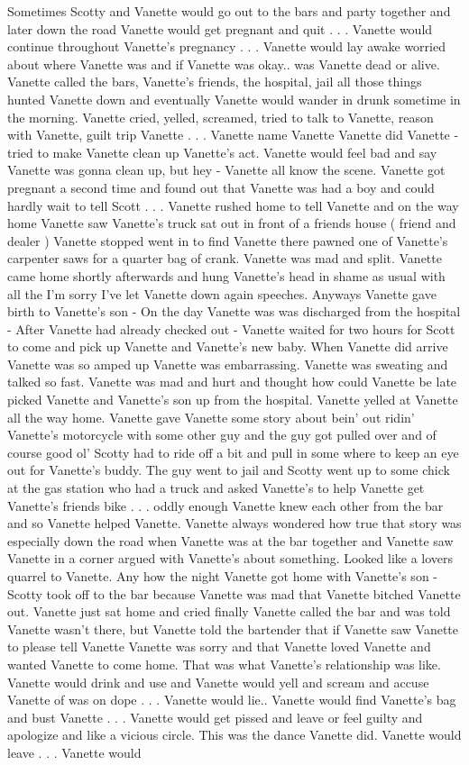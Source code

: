 \documentclass[12pt]{book}
\begin{document}
Sometimes Scotty and Vanette would go out to the bars and party together and later down the road Vanette would get pregnant and quit  . . .  Vanette would continue throughout Vanette's pregnancy  . . .  Vanette would lay awake worried about where Vanette was and if Vanette was okay.. was Vanette dead or alive. Vanette called the bars, Vanette's friends, the hospital, jail all those things hunted Vanette down and eventually Vanette would wander in drunk sometime in the morning. Vanette cried, yelled, screamed, tried to talk to Vanette, reason with Vanette, guilt trip Vanette  . . .  Vanette name Vanette Vanette did Vanette - tried to make Vanette clean up Vanette's act. Vanette would feel bad and say Vanette was gonna clean up, but hey - Vanette all know the scene. Vanette got pregnant a second time and found out that Vanette was had a boy and could hardly wait to tell Scott  . . .  Vanette rushed home to tell Vanette and on the way home Vanette saw Vanette's truck sat out in front of a friends house ( friend and dealer ) Vanette stopped went in to find Vanette there pawned one of Vanette's carpenter saws for a quarter bag of crank. Vanette was mad and split. Vanette came home shortly afterwards and hung Vanette's head in shame as usual with all the I'm sorry I've let Vanette down again speeches. Anyways Vanette gave birth to Vanette's son - On the day Vanette was was discharged from the hospital - After Vanette had already checked out - Vanette waited for two hours for Scott to come and pick up Vanette and Vanette's new baby. When Vanette did arrive Vanette was so amped up Vanette was embarrassing. Vanette was sweating and talked so fast. Vanette was mad and hurt and thought how could Vanette be late picked Vanette and Vanette's son up from the hospital. Vanette yelled at Vanette all the way home. Vanette gave Vanette some story about bein' out ridin' Vanette's motorcycle with some other guy and the guy got pulled over and of course good ol' Scotty had to ride off a bit and pull in some where to keep an eye out for Vanette's buddy. The guy went to jail and Scotty went up to some chick at the gas station who had a truck and asked Vanette's to help Vanette get Vanette's friends bike  . . .  oddly enough Vanette knew each other from the bar and so Vanette helped Vanette. Vanette always wondered how true that story was especially down the road when Vanette was at the bar together and Vanette saw Vanette in a corner argued with Vanette's about something. Looked like a lovers quarrel to Vanette. Any how the night Vanette got home with Vanette's son - Scotty took off to the bar because Vanette was mad that Vanette bitched Vanette out. Vanette just sat home and cried finally Vanette called the bar and was told Vanette wasn't there, but Vanette told the bartender that if Vanette saw Vanette to please tell Vanette Vanette was sorry and that Vanette loved Vanette and wanted Vanette to come home. That was what Vanette's relationship was like. Vanette would drink and use and Vanette would yell and scream and accuse Vanette of was on dope  . . .  Vanette would lie.. Vanette would find Vanette's bag and bust Vanette  . . .  Vanette would get pissed and leave or feel guilty and apologize and like a vicious circle. This was the dance Vanette did. Vanette would leave  . . .  Vanette would 
\end{document}
